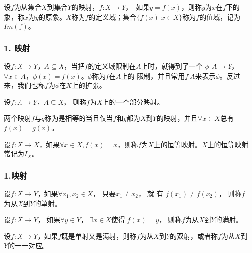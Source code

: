\documentclass{beamer}
\begin{document}
\begin{CJK*}{UTF8}{gbsn}
\begin{frame}
  \begin{Def}\justifying\let\raggedright\justifying
    设$f$为从集合$X$到集合$Y$的映射，$f:X\to Y$，　如果$y = f(x)$，则称$y$为$x$在$f$下的\alert{象}，称$x$为$y$的\alert{原象}。$X$称为$f$的\alert{定义域}；集合$\{f(x) | x \in X\}$称为$f$的\alert{值域}，记为$Im(f)$。
  \end{Def}
\end{frame}
\begin{frame}
  \frametitle{1. 映射}

  \begin{Def}
    设$f:X\to Y$，$A\subseteq X$，当把$f$的定义域限制在$A$上时，就得到了一个
    $\phi: A\to Y$，$\forall x \in A$，$\phi(x) = f(x)$。$\phi$称为$f$在$A$上的
    \alert{限制}，并且常用$f|A$来表示$\phi$。反过来，我们也称$f$为$\phi$在$X$上的\alert{扩张}。
  \end{Def}\pause
    \begin{Def}
    设$f:A \to Y$，$A \subseteq X$， 则称$f$为$X$上的一个\alert{部分映射}。
  \end{Def}\pause
  \begin{Def}
    两个映射$f$与$g$称为是\alert{相等}的当且仅当$f$和$g$都为$X$到$Y$的映射，并且$\forall x \in X$总有$f(x) = g(x)$。
  \end{Def}\pause
  \begin{Def}
    设$f:X\to X$，如果$\forall x \in X, f(x) = x$，则称$f$为$X$上的恒等映射。$X$上的恒等映射常记为$I_X$。
  \end{Def}

\end{frame}

\begin{frame}
  \frametitle{1.映射}
  \begin{Def}\justifying\let\raggedright\justifying
    设$f:X\to Y$，如果$\forall x_1, x_2 \in X$， 只要$x_1 \neq x_2$，  就 有 $f(x_1) \neq f(x_2)$，   则称$f$为从$X$到$Y$的\alert{单射}。
  \end{Def}
  \begin{Def}\justifying\let\raggedright\justifying
    设$f:X\to Y$， 如果$\forall y \in Y$， $\exists x \in X$使得 $f(x) = y$， 则称$f$为从$X$到$Y$的\alert{满射}。
  \end{Def}
  \begin{Def}\justifying\let\raggedright\justifying
    设$f:X\to Y$，如果$f$既是单射又是满射，则称$f$为从$X$到$Y$的\alert{双射}，或者称$f$为从$X$到$Y$的\alert{一一对应}。
  \end{Def}

\end{frame}

\end{CJK*}
\end{document}
